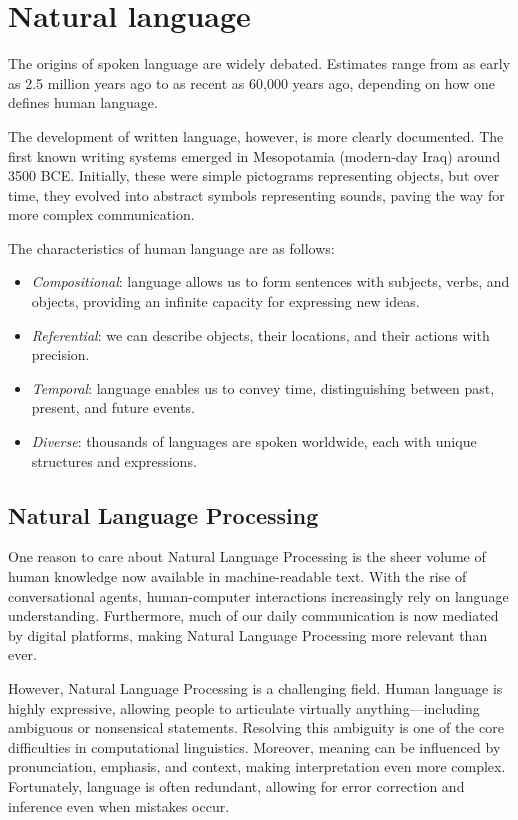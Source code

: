 \section{Natural language}

The origins of spoken language are widely debated. 
Estimates range from as early as 2.5 million years ago to as recent as 60,000 years ago, depending on how one defines human language.

The development of written language, however, is more clearly documented. 
The first known writing systems emerged in Mesopotamia (modern-day Iraq) around 3500 BCE. 
Initially, these were simple pictograms representing objects, but over time, they evolved into abstract symbols representing sounds, paving the way for more complex communication.

The characteristics of human language are as follows: 
\begin{itemize}
    \item \textit{Compositional}: language allows us to form sentences with subjects, verbs, and objects, providing an infinite capacity for expressing new ideas.
    \item \textit{Referential}: we can describe objects, their locations, and their actions with precision.
    \item \textit{Temporal}: language enables us to convey time, distinguishing between past, present, and future events.
    \item \textit{Diverse}: thousands of languages are spoken worldwide, each with unique structures and expressions.
\end{itemize}

\subsection{Natural Language Processing}
One reason to care about Natural Language Processing is the sheer volume of human knowledge now available in machine-readable text. 
With the rise of conversational agents, human-computer interactions increasingly rely on language understanding. 
Furthermore, much of our daily communication is now mediated by digital platforms, making Natural Language Processing more relevant than ever.

However, Natural Language Processing is a challenging field. 
Human language is highly expressive, allowing people to articulate virtually anything—including ambiguous or nonsensical statements. 
Resolving this ambiguity is one of the core difficulties in computational linguistics. 
Moreover, meaning can be influenced by pronunciation, emphasis, and context, making interpretation even more complex. 
Fortunately, language is often redundant, allowing for error correction and inference even when mistakes occur.


